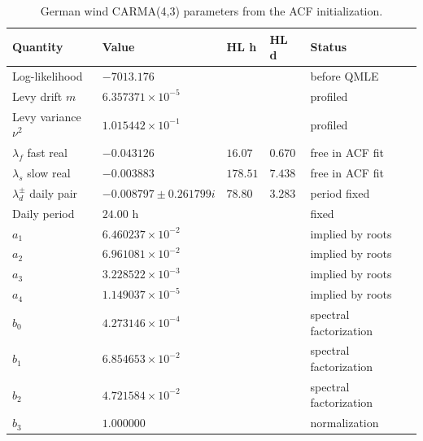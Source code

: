 \begin{table}[!htbp]
  \centering
  \caption{German wind CARMA(4,3) parameters from the ACF initialization.}
  \label{tab:wind-carma-acf-init}
  \begin{tabular}{@{}lllll@{}}
    \toprule
    Quantity & Value & HL h & HL d & Status \\
    \midrule
    Log-likelihood & \(-7013.176\) & & & before QMLE \\
    Levy drift \(m\) & \(6.357371{\times}10^{-5}\) & & & profiled \\
    Levy variance \(\nu^2\) & \(1.015442{\times}10^{-1}\) & & & profiled \\
    \midrule
    \(\lambda_f\) fast real & \(-0.043126\) & \(16.07\) & \(0.670\) & free in ACF fit \\
    \(\lambda_s\) slow real & \(-0.003883\) & \(178.51\) & \(7.438\) & free in ACF fit \\
    \(\lambda_d^\pm\) daily pair & \(-0.008797\pm0.261799i\) & \(78.80\) & \(3.283\) & period fixed \\
    Daily period & \(24.00\) h & & & fixed \\
    \midrule
    \(a_1\) & \(6.460237{\times}10^{-2}\) & & & implied by roots \\
    \(a_2\) & \(6.961081{\times}10^{-2}\) & & & implied by roots \\
    \(a_3\) & \(3.228522{\times}10^{-3}\) & & & implied by roots \\
    \(a_4\) & \(1.149037{\times}10^{-5}\) & & & implied by roots \\
    \midrule
    \(b_0\) & \(4.273146{\times}10^{-4}\) & & & spectral factorization \\
    \(b_1\) & \(6.854653{\times}10^{-2}\) & & & spectral factorization \\
    \(b_2\) & \(4.721584{\times}10^{-2}\) & & & spectral factorization \\
    \(b_3\) & \(1.000000\) & & & normalization \\
    \bottomrule
  \end{tabular}
\end{table}

